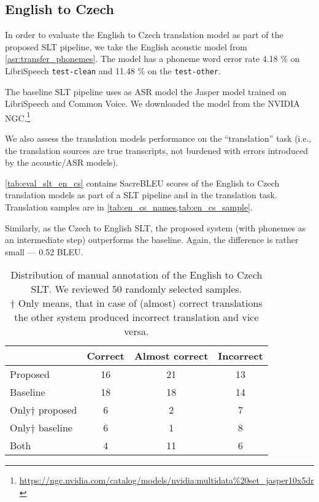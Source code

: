 \subsection{English to Czech}
In order to evaluate the English to Czech translation model as part of the proposed SLT pipeline, we take the English acoustic model from \cref{asr:transfer_phonemes}. The model has a phoneme word error rate 4.18 \% on LibriSpeech \texttt{test-clean} and 11.48 \% on the \texttt{test-other}.

The baseline SLT pipeline uses as ASR model the Jasper model trained on LibriSpeech and Common Voice. We downloaded the model from the NVIDIA NGC.\footnote{\url{https://ngc.nvidia.com/catalog/models/nvidia:multidata\%20set\_jasper10x5dr}}

We also assess the translation models performance on the ``translation'' task (i.e., the translation sources are true transcripts, not burdened with errors introduced by the acoustic/ASR models).

\cref{tab:eval_slt_en_cs} contains SacreBLEU scores of the English to Czech translation models as part of a SLT pipeline and in the translation task. Translation samples are in \cref{tab:en_cs_names,tab:en_cs_sample}.

Similarly, as the Czech to English SLT, the proposed system (with phonemes as an intermediate step) outperforms the baseline. Again, the difference is rather small --- 0.52 BLEU. 

\begin{table}[t]
	\centering
	\begin{tabular}{l|ccc}
		& Correct & Almost correct & Incorrect \\ \hline
		Proposed      & 16      & 21             & 13        \\
		Baseline      & 18       & 18             & 14        \\ \hline
		Only$\dagger$ proposed & 6       & 2              & 7         \\
		Only$\dagger$ baseline & 6       & 1              & 8        \\ \hline
		Both          & 4       & 11              & 6       
	\end{tabular}	
	\caption[English to Czech manual evaluation]{Distribution of manual annotation of the English to Czech SLT. We reviewed 50 randomly selected samples.\\$\dagger$ Only means, that in case of (almost) correct translations the other system produced incorrect translation and vice versa.}
	\label{tab:manual_en_cs}
\end{table}


